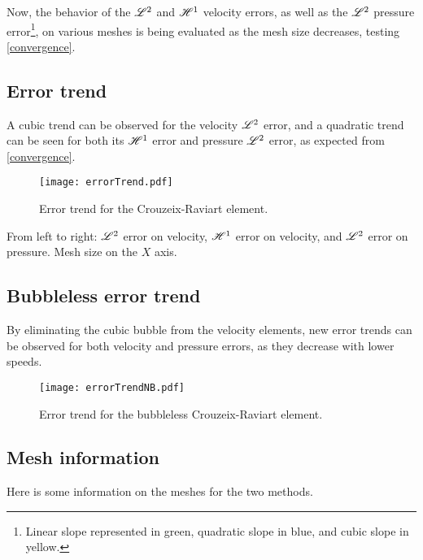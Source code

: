Now, the behavior of the $\mathscr{L}^2$ and $\mathscr{H}^1$ velocity errors, as well as the $\mathscr{L}^2$ pressure error\footnote{Linear slope represented in \textcolor{solarized-green}{green}, quadratic slope in \textcolor{solarized-blue}{blue}, and cubic slope in \textcolor{solarized-yellow}{yellow}.}, on various meshes is being evaluated as the mesh size decreases, testing \ref{convergence}.

\subsection{Error trend}

A cubic trend can be observed for the velocity $\mathscr{L}^2$ error, and a quadratic trend can be seen for both its $\mathscr{H}^1$ error and pressure $\mathscr{L}^2$ error, as expected from \ref{convergence}.

\begin{figure}[!ht]
	\centering
	\texttt{[image: errorTrend.pdf]}
	\caption{Error trend for the Crouzeix-Raviart element.}
\end{figure}

From left to right: $\mathscr{L}^2$ error on velocity, $\mathscr{H}^1$ error on velocity, and $\mathscr{L}^2$ error on pressure. Mesh size on the $X$ axis.

\newpage
\subsection{Bubbleless error trend}

By eliminating the cubic bubble from the velocity elements, new error trends can be observed for both velocity and pressure errors, as they decrease with lower speeds.

\begin{figure}[!ht]
	\centering
	\texttt{[image: errorTrendNB.pdf]}
	\caption{Error trend for the bubbleless Crouzeix-Raviart element.}
\end{figure}

\newpage
\subsection{Mesh information}

Here is some information on the meshes for the two methods.

\begin{multicols}{2}
	
	
\end{multicols}

